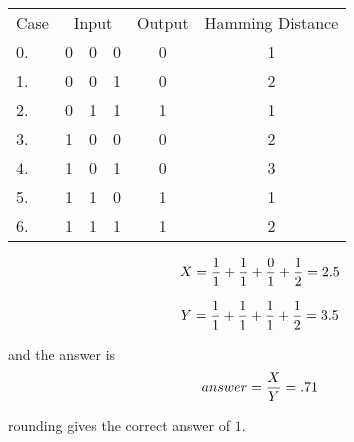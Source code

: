 \begin{center}
\begin{tabular}{llllcc}
\multicolumn{1}{c}{Case} &
\multicolumn{3}{c}{Input} &
\multicolumn{1}{c}{Output} &
\multicolumn{1}{c}{Hamming Distance} \\
0. & 0 & 0 & 0 & 0 & 1 \\
1. & 0 & 0 & 1 & 0 & 2 \\
2. & 0 & 1 & 1 & 1 & 1 \\
3. & 1 & 0 & 0 & 0 & 2 \\
4. & 1 & 0 & 1 & 0 & 3 \\
5. & 1 & 1 & 0 & 1 & 1 \\
6. & 1 & 1 & 1 & 1 & 2 
\end{tabular}
\end{center}

$$X = {1 \over 1} + {1 \over 1} + {0 \over 1} + {1 \over 2} = 2.5$$

$$Y = {1 \over 1} + {1 \over 1} + { 1 \over 1} + {1 \over 2} = 3.5$$

	and the answer is
	$$answer = {X \over Y} = .71$$ 

	rounding gives the correct answer of $1$.
	

